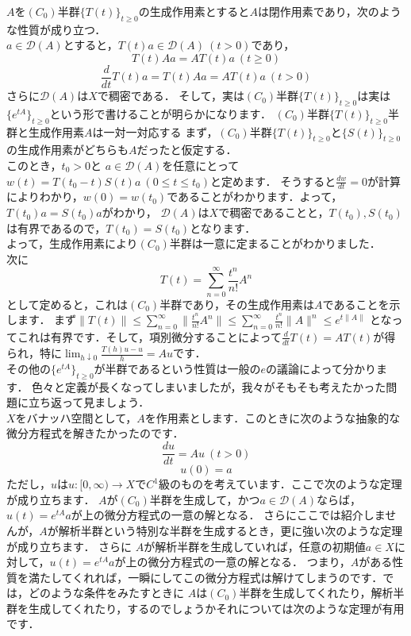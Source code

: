 \thm
$A$を$(C_0)$半群$\{T(t)\}_{t\ge 0}$の生成作用素とすると$A$は閉作用素であり，次のような性質が成り立つ．\\
$a \in \mathcal{D}(A)$とすると，$T(t)a \in \mathcal{D}(A) \ (t>0)$であり，
\[
T(t) A a= AT(t) a \ (t\ge 0)
\]
\[
\frac{d}{dt}T(t) a = T(t) A a = A T(t) a \ (t>0)
\]
さらに$\mathcal{D}(A)$は$X$で稠密である．
\thmx
そして，実は$(C_0)$半群$\{T(t)\}_{t\ge 0}$は実は$\{e^{tA}\}_{t\ge 0}$という形で書けることが明らかになります．
\thm
$(C_0)$半群$\{T(t)\}_{t\ge 0}$半群と生成作用素$A$は一対一対応する
\thmx
\proof
まず，$(C_0)$半群$\{T(t)\}_{t\ge 0}$と$\{S(t)\}_{t\ge 0}$の生成作用素がどちらも$A$だったと仮定する．\\
このとき，$t_0 >0 $と $a\in \mathcal{D}(A)$を任意にとって$w(t) = T(t_0 - t) S(t) a\ (0 \le t \le t_0)$と定めます．
そうすると$\frac{dw}{dt} = 0$が計算によりわかり，$w(0)=w(t_0)$であることがわかります．よって，$T(t_0)a=S(t_0)a$がわかり，
$\mathcal{D}(A)$は$X$で稠密であることと，$T(t_0),S(t_0)$は有界であるので，$T(t_0)=S(t_0)$となります．\\
よって，生成作用素により$(C_0)$半群は一意に定まることがわかりました．\\
次に\[
T(t) = \sum_{n=0}^\infty \frac{t^n}{n!}A^n
\]
として定めると，これは$(C_0)$半群であり，その生成作用素は$A$であることを示します．
まず$\|T(t)\| \le  \sum_{n=0}^\infty \| \frac{t^n}{n!}A^n \| \le \sum_{n=0}^\infty  \frac{t^n}{n!}\|A\|^n \le e^{t\|A\|}$
となってこれは有界です．そして，項別微分することによって$\frac{d}{dt}T(t) = AT(t)$が得られ，特に$\lim_{h\downarrow 0} \frac{T(h)u-u}{h} = Au$です．\\
その他の$\{e^{tA}\}_{t\ge 0}$が半群であるという性質は一般の$e$の議論によって分かります．
\proofx
{}
色々と定義が長くなってしまいましたが，我々がそもそも考えたかった問題に立ち返って見ましょう．\\
$X$をバナッハ空間として，$A$を作用素とします．このときに次のような抽象的な微分方程式を解きたかったのです．\\
\[ \frac{du}{dt} = Au \ (t>0) \]
\[ u(0) = a \]
ただし，$u$は$u:[0,\infty) \to  X$で$C^1$級のものを考えています．ここで次のような定理が成り立ちます．
\thm
$A$が$(C_0)$半群を生成して，かつ$a \in \mathcal{D}(A)$ならば，$u(t) = e^{tA} a$が上の微分方程式の一意の解となる．
\thmx
さらにここでは紹介しませんが，$A$が解析半群という特別な半群を生成するとき，更に強い次のような定理が成り立ちます．
\thm
さらに $A$が解析半群を生成していれば，任意の初期値$a\in X$に対して，$u(t) = e^{tA} a$が上の微分方程式の一意の解となる．
\thmx
つまり，$A$がある性質を満たしてくれれば，一瞬にしてこの微分方程式は解けてしまうのです．では，どのような条件をみたすときに
$A$は$(C_0)$半群を生成してくれたり，解析半群を生成してくれたり，するのでしょうかそれについては次のような定理が有用です．

